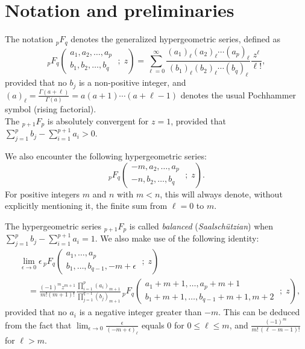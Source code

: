 \documentclass{article}
\theoremstyle{boldremark}
\renewcommand\[{\begin{equation}}
\renewcommand\]{\end{equation}}
\theoremstyle{definition}
\numberwithin{equation}{section}
\begin{document}
\section{Notation and preliminaries}
The notation ${}_p F_q$ denotes the generalized hypergeometric series, defined as
$$
{}_p F_q\left( \begin{matrix} a_1, a_2, \dots, a_p \\[3pt] b_1, b_2, \dots, b_q \end{matrix} \;;\; z \right) = \sum_{\ell=0}^{\infty} \frac{(a_1)_\ell (a_2)_\ell \cdots (a_p)_\ell}{(b_1)_\ell (b_2)_\ell \cdots (b_q)_\ell} \frac{z^\ell}{\ell!},
$$
provided that no $b_j$ is a non-positive integer,
and $(a)_\ell = \frac{\Gamma(a+\ell)}{\Gamma(a)} = a(a+1)\cdots(a+\ell-1)$ denotes the usual Pochhammer symbol (rising factorial).\\
The $_{p+1}F_{p}$ is absolutely convergent for $z=1$, provided that $\sum_{j=1}^p b_j - \sum_{i=1}^{p+1} a_i > 0$. 

We also encounter the following hypergeometric series:
$$
{}_p F_q\left( \begin{matrix} -m, a_2, \dots, a_p \\[3pt] -n, b_2, \dots, b_q \end{matrix} \;;\; z \right).
$$
For positive integers $m$ and $n$ with $m < n$, this will always denote, without explicitly mentioning it, the finite sum from $\ell = 0$ to $m$.

The hypergeometric series ${}_{p+1}F_p$ is called \textit{balanced} (\textit{Saalschützian}) when $\sum_{j=1}^p b_j - \sum_{i=1}^{p+1} a_i = 1$.
We also make use of the following identity:
\begin{align}\label{TheIdentity}
   &\lim_{\epsilon \to 0} \epsilon \, {}_p F_q\left( \begin{matrix} a_1, \dots, a_p \\[3pt] b_1, \dots, b_{q-1}, -m+\epsilon \end{matrix} \;;\; z \right) \nonumber \\
   &\quad = \frac{(-1)^m z^{m+1}}{m! (m+1)!} \frac{\prod_{i=1}^p (a_i)_{m+1}}{\prod_{j=1}^{q-1} (b_j)_{m+1}} \, {}_p F_q\left( \begin{matrix} a_1+m+1, \dots, a_p+m+1 \\ b_1+m+1, \dots, b_{q-1}+m+1, m+2 \end{matrix} \;;\; z \right),
\end{align}
provided that no $a_i$ is a negative integer greater than $-m$.
This can be deduced from the fact that $\lim_{\epsilon \to 0}\frac{\epsilon}{(-m+\epsilon)_\ell}$ equals $0$ for $0\leq \ell \leq m$, and $\frac{(-1)^m}{m!\,(\ell-m-1)!}$ for $\ell > m$.
\end{document}
